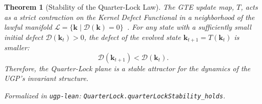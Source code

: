 \documentclass[12pt]{article}
\newtheorem{theorem}{Theorem}[section]
\numberwithin{equation}{section}
\begin{document}
\begin{theorem}[Stability of the Quarter-Lock Law]
\label{thm:kernel_stability}
The GTE update map, $T$, acts as a strict contraction on the Kernel Defect Functional in a neighborhood of the lawful manifold $\mathcal{L} = \{ \mathbf{k} \mid \mathcal{D}(\mathbf{k}) = 0 \}$~\cite{SpivackUGPFormalization,ugp-lean}. For any state with a sufficiently small initial defect $\mathcal{D}(\mathbf{k}_t) > 0$, the defect of the evolved state $\mathbf{k}_{t+1} = T(\mathbf{k}_t)$ is smaller:
\begin{equation}
    \mathcal{D}(\mathbf{k}_{t+1}) < \mathcal{D}(\mathbf{k}_t).
\end{equation}
Therefore, the Quarter-Lock plane is a stable attractor for the dynamics of the UGP's invariant structure.

\noindent\emph{Formalized in} \texttt{ugp-lean}: \texttt{QuarterLock.quarterLockStability\_holds}.
\end{theorem}
\end{document}

